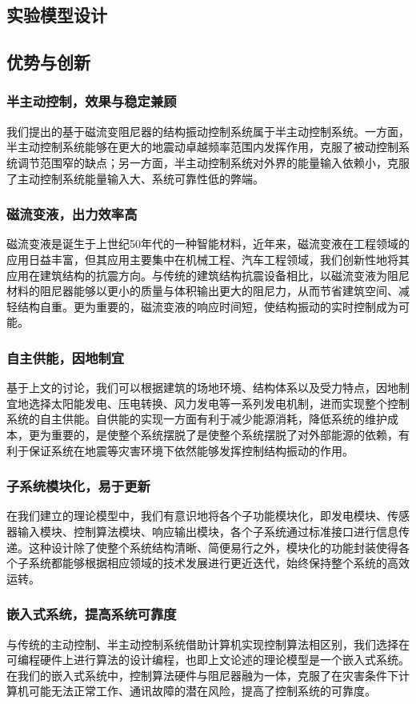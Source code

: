 \subsection{实验模型设计}

\subsection{优势与创新}

\subsubsection{半主动控制，效果与稳定兼顾}
我们提出的基于磁流变阻尼器的结构振动控制系统属于半主动控制系统。一方面，半主动控制系统能够在更大的地震动卓越频率范围内发挥作用，克服了被动控制系统调节范围窄的缺点；另一方面，半主动控制系统对外界的能量输入依赖小，克服了主动控制系统能量输入大、系统可靠性低的弊端。

\subsubsection{磁流变液，出力效率高}
磁流变液是诞生于上世纪50年代的一种智能材料，近年来，磁流变液在工程领域的应用日益丰富，但其应用主要集中在机械工程、汽车工程领域，我们创新性地将其应用在建筑结构的抗震方向。与传统的建筑结构抗震设备相比，以磁流变液为阻尼材料的阻尼器能够以更小的质量与体积输出更大的阻尼力，从而节省建筑空间、减轻结构自重。更为重要的，磁流变液的响应时间短，使结构振动的实时控制成为可能。

\subsubsection{自主供能，因地制宜}
基于上文的讨论，我们可以根据建筑的场地环境、结构体系以及受力特点，因地制宜地选择太阳能发电、压电转换、风力发电等一系列发电机制，进而实现整个控制系统的自主供能。自供能的实现一方面有利于减少能源消耗，降低系统的维护成本，更为重要的，是使整个系统摆脱了是使整个系统摆脱了对外部能源的依赖，有利于保证系统在地震等灾害环境下依然能够发挥控制结构振动的作用。

\subsubsection{子系统模块化，易于更新}
在我们建立的理论模型中，我们有意识地将各个子功能模块化，即发电模块、传感器输入模块、控制算法模块、响应输出模块，各个子系统通过标准接口进行信息传递。这种设计除了使整个系统结构清晰、简便易行之外，模块化的功能封装使得各个子系统都能够根据相应领域的技术发展进行更近迭代，始终保持整个系统的高效运转。

\subsubsection{嵌入式系统，提高系统可靠度}
与传统的主动控制、半主动控制系统借助计算机实现控制算法相区别，我们选择在可编程硬件上进行算法的设计编程，也即上文论述的理论模型是一个嵌入式系统。在我们的嵌入式系统中，控制算法硬件与阻尼器融为一体，克服了在灾害条件下计算机可能无法正常工作、通讯故障的潜在风险，提高了控制系统的可靠度。